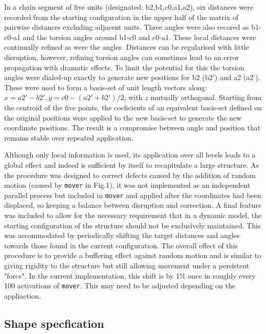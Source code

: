 In a chain segment of five units (designated: b2,b1,c0,a1,a2), six distances were
recorded from the starting configuration in the upper half of the matrix of pairwise
distances excluding adjacent units.  Three angles were also recored as b1-c0-a1 and
the torsion angles around b1-c0 and c0-a1.   These local distances were continually
refined as were the angles.  Distances can be regularised with little disruption,
however, refining torsion angles can sometimes lead to an error propagation
with dramatic effects.  To limit the potential for this the torsion angles were
dialed-up exactly to generate new positions for b2 (b2') and a2 (a2').   These were
used to form a basis-set of unit length vectors along: $x = a2'-b2', y = c0-(a2'+b2')/2$,
with $z$ mutually orthogonal.   Starting from the centroid of the five points, the 
coeficients of an equivalent basis-set defined on the original positions were applied
to the new basis-set to generate the new coordinate positions.  The result is a
compromise between angle and position that remains stable over repeated application.

Although only local information is used, its application over all levels leads to a
global effect and indeed is sufficient by itself to recapitulate a large structure.
As the procedure was designed to correct defects caused by the addition of random
motion (caused by {\tt mover} in Fig.1), it was not implemented as an independent
parallel process but included in {\tt mover} and applied after the coordinates had been 
displaced, so keeping a balance between disruption and correction.  A final feature
was included to allow for the necessary requirement that in a dynamic model, the
starting configuration of the structure should not be exclusively maintained.  This
was accommodated by periodically shifting the target distances and angles towards
those found in the current configuration.   The overall effect of this procedure is
to provide a buffering effect against random motion and is similar to giving
rigidity to the structure but still allowing movement under a persistent "force".
In the current implementation, this shift is by 1\% once in roughly every 100
activations of {\tt mover}.  This may need to be adjusted depending on the appliaction.

\subsection{Shape specfication}

